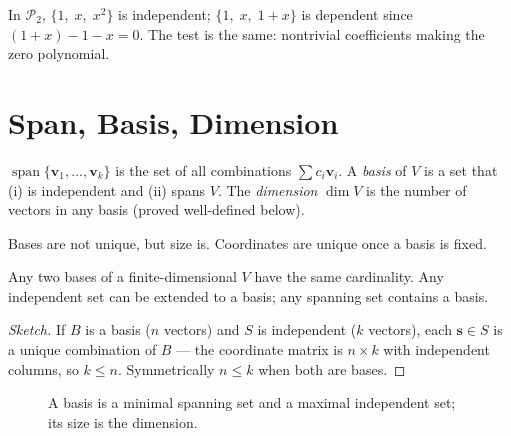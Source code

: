 \begin{example}[Polynomials]
In $\mathcal{P}_2$, $\{1,\;x,\;x^2\}$ is independent; $\{1,\;x,\;1+x\}$ is dependent since $(1+x)-1-x=0$. The test is the same: nontrivial coefficients making the zero polynomial.
\end{example}

\section{Span, Basis, Dimension}
\label{sec:basis}
\begin{definition}
$\operatorname{span}\{\mathbf{v}_1,\dots,\mathbf{v}_k\}$ is the set of all combinations $\sum c_i\mathbf{v}_i$. A \emph{basis} of $V$ is a set that (i) is independent and (ii) spans $V$. The \emph{dimension} $\dim V$ is the number of vectors in any basis (proved well-defined below).
\end{definition}

Bases are not unique, but size is. Coordinates are unique once a basis is fixed.

\begin{theorem}
Any two bases of a finite-dimensional $V$ have the same cardinality. Any independent set can be extended to a basis; any spanning set contains a basis.
\end{theorem}
\begin{proof}[Sketch]
If $B$ is a basis ($n$ vectors) and $S$ is independent ($k$ vectors), each $\mathbf{s}\in S$ is a unique combination of $B$ --- the coordinate matrix is $n\times k$ with independent columns, so $k\le n$. Symmetrically $n\le k$ when both are bases.
\end{proof}

\begin{figure}[h]
\centering
{}
\caption{A basis is a minimal spanning set and a maximal independent set; its size is the dimension.}
\label{fig:basis-dimension}
\end{figure}

